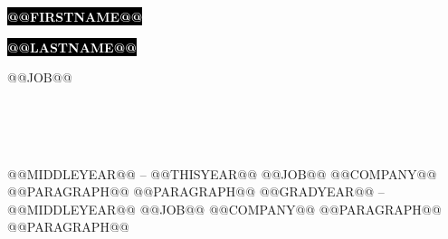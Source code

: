 \documentclass[9pt]{developercv} %
\begin{document}

\begin{minipage}[t]{0.45\textwidth} %
	\vspace{-\baselineskip} %
	
	\colorbox{black}{{\HUGE\textcolor{white}{\textbf{\MakeUppercase{@@FIRSTNAME@@}}}}} %
	
	\colorbox{black}{{\HUGE\textcolor{white}{\textbf{\MakeUppercase{@@LASTNAME@@}}}}} %
	
	\vspace{6pt}
	
	{\huge @@JOB@@} %
\end{minipage}
\hfill
\begin{minipage}[t]{0.275\textwidth} %
	\vspace{-\baselineskip} %
	
	\\
	\\
	\\	
\end{minipage}

\vspace{0.5cm}



\begin{entrylist}
	\entry
		{@@MIDDLEYEAR@@ -- @@THISYEAR@@}
		{@@JOB@@}
		{@@COMPANY@@}
		{@@PARAGRAPH@@ @@PARAGRAPH@@}
	\entry
		{@@GRADYEAR@@ -- @@MIDDLEYEAR@@}
		{@@JOB@@}
		{@@COMPANY@@}
		{@@PARAGRAPH@@ @@PARAGRAPH@@}
\end{entrylist}
\end{document}
